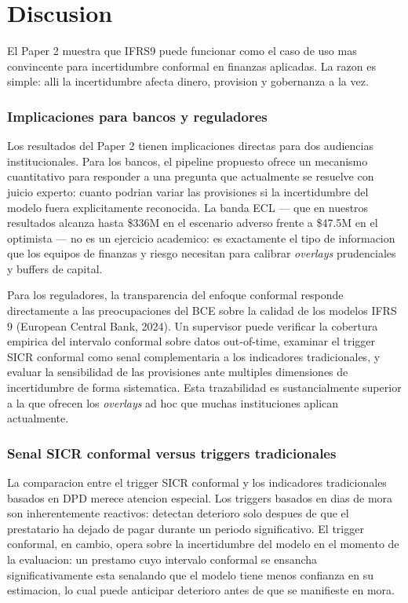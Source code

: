\documentclass[
  spanish,
  11pt,
  letterpaper,
]{scrbook}
\theoremstyle{plain}
\theoremstyle{remark}
\begin{document}
\chapter{Discusion}\label{sec-p2-discussion}

El Paper 2 muestra que IFRS9 puede funcionar como el caso de uso mas
convincente para incertidumbre conformal en finanzas aplicadas. La razon
es simple: alli la incertidumbre afecta dinero, provision y gobernanza a
la vez.

\subsection{Implicaciones para bancos y
reguladores}\label{sec-p2-policy}

Los resultados del Paper 2 tienen implicaciones directas para dos
audiencias institucionales. Para los bancos, el pipeline propuesto
ofrece un mecanismo cuantitativo para responder a una pregunta que
actualmente se resuelve con juicio experto: cuanto podrian variar las
provisiones si la incertidumbre del modelo fuera explicitamente
reconocida. La banda ECL --- que en nuestros resultados alcanza hasta
\$336M en el escenario adverso frente a \$47.5M en el optimista --- no
es un ejercicio academico: es exactamente el tipo de informacion que los
equipos de finanzas y riesgo necesitan para calibrar \emph{overlays}
prudenciales y buffers de capital.

Para los reguladores, la transparencia del enfoque conformal responde
directamente a las preocupaciones del BCE sobre la calidad de los
modelos IFRS 9 (European Central Bank, 2024). Un supervisor puede
verificar la cobertura empirica del intervalo conformal sobre datos
out-of-time, examinar el trigger SICR conformal como senal
complementaria a los indicadores tradicionales, y evaluar la
sensibilidad de las provisiones ante multiples dimensiones de
incertidumbre de forma sistematica. Esta trazabilidad es sustancialmente
superior a la que ofrecen los \emph{overlays} ad hoc que muchas
instituciones aplican actualmente.

\subsection{Senal SICR conformal versus triggers
tradicionales}\label{sec-p2-sicr-comparison}

La comparacion entre el trigger SICR conformal y los indicadores
tradicionales basados en DPD merece atencion especial. Los triggers
basados en dias de mora son inherentemente reactivos: detectan deterioro
solo despues de que el prestatario ha dejado de pagar durante un periodo
significativo. El trigger conformal, en cambio, opera sobre la
incertidumbre del modelo en el momento de la evaluacion: un prestamo
cuyo intervalo conformal se ensancha significativamente esta senalando
que el modelo tiene menos confianza en su estimacion, lo cual puede
anticipar deterioro antes de que se manifieste en mora.
\end{document}
